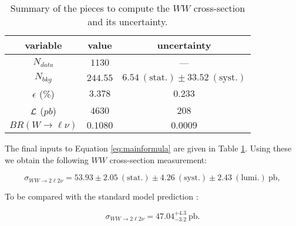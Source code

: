 \begin{table}[!ht]
\begin{center}
\begin{tabular}{|c|c|c|}
\hline
 variable      &  value & uncertainty \\
\hline
$N_{data}$     & $1130$ & ---\\
\hline
$N_{bkg}$      & $244.55$ & $6.54~\mathrm{(stat.)} \pm 33.52~\mathrm{(syst.)}$ \\
\hline
$\epsilon$ (\%) & $3.378$ & $0.233$  \\
\hline
$\cal{L}$ ($pb$) & $4630$ & $208$ \\
\hline
$BR(W \to \ell \nu)$ & $0.1080$ & $0.0009$ \\
\hline
\end{tabular}
\caption{Summary of the pieces to compute the $WW$ cross-section and its uncertainty.}
  \label{tab:xs_summary}
\end{center}
\end{table}

The final inputs to Equation \ref{eq:mainformula} are given in
Table \ref{tab:xs_summary}.  Using these we obtain the following 
$WW$ cross-section measurement:

\begin{equation*}
\sigma_{WW \to 2\ell 2\nu}  = 53.93 \pm 2.05~\mathrm{(stat.)} \pm 4.26~\mathrm{(syst.)} \pm 2.43~\mathrm{(lumi.)~pb},
\end{equation*}

To be compared with the standard model prediction \cite{Campbell:2011bn}:

\begin{equation*}
\sigma_{WW \to 2\ell 2\nu}  = 47.04^{+4.3}_{-3.2} ~\mathrm{pb}.
\end{equation*}




